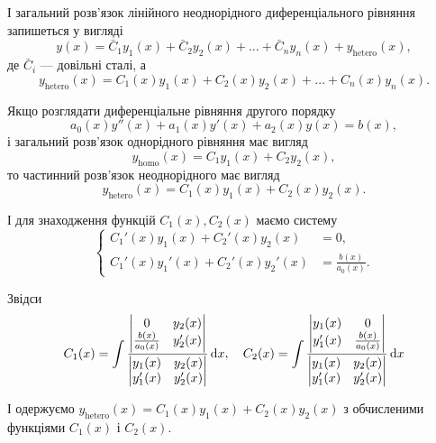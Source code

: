 І загальний розв'язок лінійного неоднорідного диференціального рівняння запишеться у вигляді
\begin{equation*}
	y(x) = \bar C_1 y_1(x) + \bar C_2 y_2(x) + \ldots + \bar C_n y_n(x) + y_{\text{hetero}}(x),
\end{equation*}
де $\bar C_i$ --- довільні сталі, а
\begin{equation*}
	y_{\text{hetero}}(x) = C_1(x) y_1(x) + C_2(x) y_2(x) + \ldots + C_n(x) y_n(x).
\end{equation*}

Якщо розглядати диференціальне рівняння другого порядку
\begin{equation*}
	a_0(x) y''(x) + a_1(x) y'(x) + a_2(x) y(x) = b(x),
\end{equation*}
і загальний розв'язок однорідного рівняння має вигляд
\begin{equation*}
	y_{\text{homo}}(x) = C_1 y_1(x) + C_2 y_2(x),
\end{equation*}
то частинний розв'язок неоднорідного має вигляд 
\begin{equation*}
	y_{\text{hetero}}(x) = C_1(x) y_1(x) + C_2(x) y_2(x).
\end{equation*}

І для знаходження функцій $C_1(x), C_2(x)$ маємо систему
\begin{equation*}
	\left\{ \begin{aligned}
		C_1'(x) y_1(x) + C_2'(x) y_2(x) &= 0, \\
		C_1'(x) y_1'(x) + C_2'(x) y_2'(x) &= \frac{b(x)}{a_0(x)}.
	\end{aligned} \right.
\end{equation*}

Звідси
\begin{equation*}
	C_1(x) = \int \frac{\begin{vmatrix} 0 & y_2(x) \\ \frac{b(x)}{a_0(x)} & y_2'(x) \end{vmatrix}}{\begin{vmatrix} y_1(x) & y_2(x) \\ y_1'(x) & y_2'(x) \end{vmatrix}} \mathop{}\!\mathrm{d} x, \quad C_2(x) = \int \frac{\begin{vmatrix} y_1(x) & 0 \\ y_1'(x) & \frac{b(x)}{a_0(x)} \end{vmatrix}}{\begin{vmatrix} y_1(x) & y_2(x) \\ y_1'(x) & y_2'(x) \end{vmatrix}} \mathop{}\!\mathrm{d} x
\end{equation*}

І одержуємо $y_{\text{hetero}}(x) = C_1(x) y_1(x) + C_2(x) y_2(x)$ з обчисленими функціями $C_1(x)$ і $C_2(x)$.
